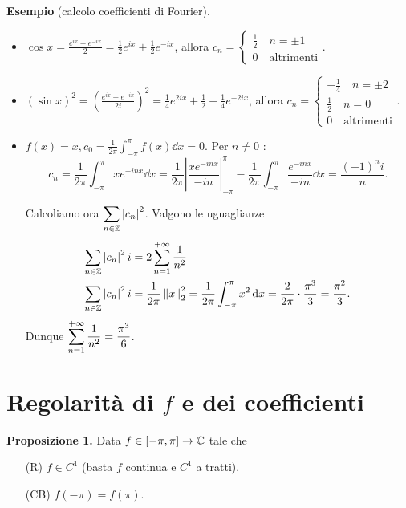 %
%


\textbf{Esempio} (calcolo coefficienti di Fourier).
\begin{itemize}
\item $\cos x = \frac{e^{ix} - e^{-ix}}{2} = \frac{1}{2} e^{ix} + \frac{1}{2} e^{-ix}$, allora $ c_n =
\begin{cases}
\frac{1}{2} \quad n = \pm 1 \\
0 \quad \text{altrimenti} 
\end{cases}. 
$

\item $(\sin x)^2 = (\frac{e^{ix} - e^{-ix}}{2i})^2 = \frac{1}{4} e^{2ix} + \frac{1}{2} - \frac{1}{4} e^{-2ix}$, allora $c_n =
\begin{cases}
-\frac{1}{4} \quad n = \pm 2 \\
\frac{1}{2} \quad n = 0 \\
0 \quad \text{altrimenti} 
\end{cases} $.

\item $f(x) = x, c_0 = \frac{1}{2\pi} \int_{-\pi}^\pi f(x) \dd x = 0$. Per $n \neq 0$ :
%
$$
c_n = \frac{1}{2\pi} \int_{-\pi}^\pi xe^{-inx} \dd x = \frac{1}{2\pi} \left| \frac{x e^{-inx}}{-in} \right|_{-\pi}^\pi - \frac{1}{2\pi} \int_{-\pi}^\pi \frac{e^{-inx}}{-in} \dd x = \frac{(-1)^n i}{n}.
$$
%

Calcoliamo ora  $\displaystyle \sum_{n \in \mathbb Z} \left| c_n \right|^2$.
Valgono le uguaglianze
%
\begin{align*}
\sum_{n \in \mathbb Z} \left| c_n \right|^2i & = 2 \sum_{n=1}^{+\infty} \frac{1}{n^2} \\
\sum_{n \in \mathbb Z} \left| c_n \right|^2i & = \frac{1}{2\pi } \left\lVert x \right\rVert_2^2 = \frac{1}{2\pi } \int_{-\pi}^\pi x^2 \,\mathrm{d} x = \frac{2}{2\pi} \cdot \frac{\pi^3}{3} = \frac{\pi^2}{3}.
\end{align*}
%
Dunque $\displaystyle \sum_{n=1}^{+\infty} \frac{1}{n^2} = \frac{\pi^3}{6}$.

\end{itemize}

\section{Regolarità di $f$ e dei coefficienti}

\textbf{Proposizione 1.} Data $f \in [-\pi,\pi] \to \mathbb C$ tale che
\begin{itemize}
\item[(R)] $f \in C^1$ (basta $f$ continua e  $C^1$ a tratti).

\item[(CB)] $f(-\pi) = f(\pi)$.
\end{itemize}

